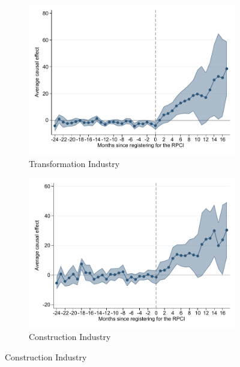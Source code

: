 \documentclass[oneside,11pt]{article}
\begin{document}
\clearpage

\begin{figure}[H]
    \caption{Event studies - RPCI effect on wage by firm characteristics}
    \label{event_study_wage_firm_characteristics}
    \begin{center}
    
    \begin{subfigure}{0.49\textwidth}
    \caption{Transformation Industry}
    \includegraphics[width=\textwidth]{04_Figures/muestra_10porciento/event_study_sal_cierre_chaisemartin_div_final_3.pdf}
    \end{subfigure}
    \begin{subfigure}{0.49\textwidth}
    \caption{Construction Industry}
    \includegraphics[width=\textwidth]{04_Figures/muestra_10porciento/event_study_sal_cierre_chaisemartin_div_final_4.pdf}
    \end{subfigure}
    

\end{center}
\end{figure}
\end{document}
